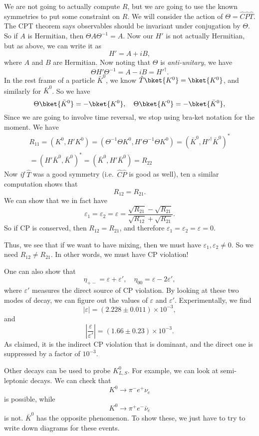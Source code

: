 \documentclass[a4paper]{article}
\begin{document}
We are not going to actually compute $R$, but we are going to use the known symmetries to put some constraint on $R$. We will consider the action of $\Theta = \hat{C}\hat{P}\hat{T}$. The CPT theorem says observables should be invariant under conjugation by $\Theta$. So if $A$ is Hermitian, then $\Theta A \Theta^{-1} = A$. Now our $H'$ is not actually Hermitian, but as above, we can write it as
\[
  H' = A + i B,
\]
where $A$ and $B$ are Hermitian. Now noting that $\Theta$ is \emph{anti-unitary}, we have
\[
  \Theta H' \Theta^{-1} = A - iB = H'^\dagger.
\]
In the rest frame of a particle $\bar{K}^0$, we know $\hat{T} \bket{K^0} = \bket{K^0}$, and similarly for $\bar{K}^0$. So we have
\[
  \Theta \bket{\bar{K}^0} = - \bket{K^0},\quad \Theta \bket{K^0} = - \bket{\bar{K}^0},
\]
Since we are going to involve time reversal, we stop using bra-ket notation for the moment. We have
\begin{multline*}
  R_{11} = (K^0, H' K^0)
  = (\Theta^{-1}\Theta K^0, H' \Theta^{-1}\Theta K^0)
  = (\bar{K}^0, H'^\dagger \bar{K}^0)^*\\
  = (H' \bar{K}^0, \bar{K}^0)^*
  = (\bar K^0, H' \bar{K}^0)
  = R_{22}
\end{multline*}
Now \emph{if} $\hat{T}$ was a good symmetry (i.e.\ $\hat{C}\hat{P}$ is good as well), ten a similar computation shows that
\[
  R_{12} = R_{21}.
\]
We can show that we in fact have %
\[
  \varepsilon_1 = \varepsilon_2 = \varepsilon = \frac{\sqrt{R_{21}} - \sqrt{R_{21}}}{\sqrt{R_{12}} + \sqrt{R_{21}}}.
\]
So if CP is conserved, then $R_{12} = R_{21}$, and therefore $\varepsilon_1 = \varepsilon_2 = \varepsilon = 0$.

Thus, we see that if we want to have mixing, then we must have $\varepsilon_1, \varepsilon_2 \not= 0$. So we need $R_{12} \not =R_{21}$. In other words, we must have CP violation!

One can also show that
\[
  \eta_{+-} = \varepsilon + \varepsilon',\quad \eta_{00} = \varepsilon - 2 \varepsilon',
\]
where $\varepsilon'$ measures the direct source of CP violation. By looking at these two modes of decay, we can figure out the values of $\varepsilon$ and $\varepsilon'$. Experimentally, we find
\[
  |\varepsilon| = (2.228 \pm 0.011) \times 10^{-3},
\]
and
\[
  \left|\frac{\varepsilon}{\varepsilon'}\right| = (1.66 \pm 0.23) \times 10^{-3}.
\]
As claimed, it is the indirect CP violation that is dominant, and the direct one is suppressed by a factor of $10^{-3}$.

Other decays can be used to probe $K_{L, S}^0$. For example, we can look at semi-leptonic decays. We can check that
\[
  K^0 \to \pi^- e^+ \nu_e
\]
is possible, while
\[
  K^0 \to \pi^+ e^- \bar{\nu}_e
\]
is not. $\bar{K}^0$ has the opposite phenomenon. To show these, we just have to try to write down diagrams for these events. %
\end{document}
